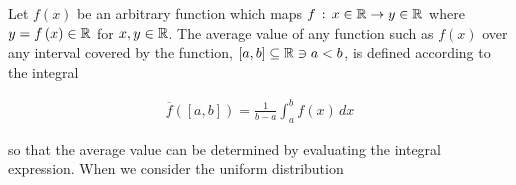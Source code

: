 \documentclass[ClusteringConnectionsMAIN.tex]{subfiles}
\begin{document}
	

  Let $f \left( x \right)$ be an arbitrary function which maps $f \, : \, x \in \mathbb{R} \rightarrow y \in \mathbb{R}$ where $y = f \left( x \right) \in \mathbb{R}$ for $x, y \in \mathbb{R}$.  The average value of any function such as $f \left( x \right)$ over any interval covered by the function, $\left[ a, b \right] \subseteq \mathbb{R} \ni a < b$, is defined according to the integral

\begin{align*}
\overline{ f } \left( \left[ a, b \right] \right) = \frac{1}{b - a} \int_a^b f \left( x \right) \, dx
\end{align*}

so that the average value can be determined by evaluating the integral expression.  When we consider the uniform distribution
\end{document}
